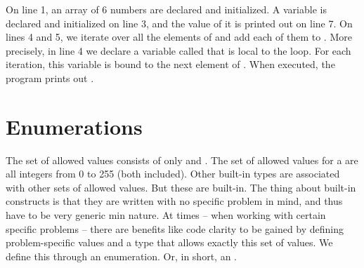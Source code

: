 \inputminted[linenos]{csharp}{../src/csharp/primdata/foreach/Program.cs}

On line 1, an array of 6  numbers are declared and initialized. A  variable is declared and initialized on line 3, and the value of it is printed out on line 7. On lines 4 and 5, we iterate over all the elements of  and add each of them to . More precisely, in line 4 we declare a variable called  that is local to the loop. For each iteration, this variable is bound to the next element of . When executed, the program prints out .



\section{Enumerations}


The set of allowed  values consists of only  and . The set of allowed values for a  are all integers from 0 to 255 (both included). Other built-in types are associated with other sets of allowed values. But these are built-in. The thing about built-in constructs is that they are written with no specific problem in mind, and thus have to be very generic min nature. At times -- when working with certain specific problems -- there are benefits like code clarity to be gained by defining problem-specific values and a type that allows exactly this set of values. We define this through an enumeration. Or, in short, an .

